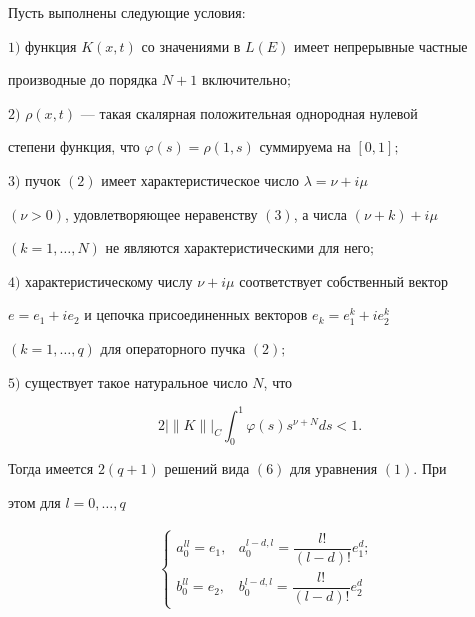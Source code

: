 \begin{thmnonum} 


Пусть выполнены следующие условия\/${:}$ 


 


$1)$ функция $K(x,t)$ со значениями в $L(E)$ имеет непрерывные частные 


производные до порядка $N+1$ включительно$;$ 


 


$2)$ $\rho(x,t)$ --- такая скалярная положительная однородная нулевой 


степени функция, что $\varphi(s)=\rho(1,s)$ суммируема на $[0,1];$ 


 


$3)$ пучок $(2)$ имеет характеристическое число $\lambda=\nu+i\mu$ 


$(\nu>0)$, удовлетворяющее неравенству $(3)$, а числа $(\nu+k)+i\mu$ 


$(k=1,\dotsc,N)$ не являются характеристическими для него$;$ 


 


$4)$ характеристическому числу $\nu+i\mu$ соответствует собственный вектор 


$e=e_1+ie_2$ и цепочка присоединенных векторов $e_k=e^k_1+ie^k_2$ 


$(k=1,\dotsc,q)$ для операторного пучка $(2);$ 


 


$5)$ существует такое натуральное число $N$, что 


$$ 


2\big|\|K\|\big|_C\int^1_0\varphi(s)s^{\nu+N}ds<1. 


$$ 


 


Тогда имеется $2(q+1)$ решений вида $(6)$ для уравнения $(1)$. При 


этом для $l=0,\dotsc,q$ 


\begin{align*} 


&\ 


\begin{cases} 


a^{ll}_0=e_1, & a^{l-d,l}_0=\dfrac{l!}{(l-d)!}e^d_1;\\ 


b^{ll}_0=e_2, & b^{l-d,l}_0=\dfrac{l!}{(l-d)!}e^d_2 



\end{cases}
\end{align*}
\end{thmnonum}
